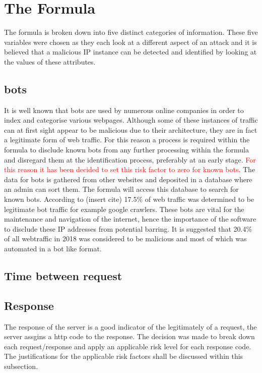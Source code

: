 \section{The Formula}

The formula is broken down into five distinct categories of information. These five variables were chosen as they each look at a different aspect of an attack and it is believed that a malicious IP instance can be detected and identified by looking at the values of these attributes. 

\subsection{bots}

It is well known that bots are used by numerous online companies in order to index and categorise various webpages. Although some of these instances of traffic can at first sight appear to be malicious due to their architecture, they are in fact a legitimate form of web traffic. For this reason a process is required within the formula to disclude known bots from any further processing within the formula and disregard them at the identification process, preferably at an early stage. \textcolor{red}{For this reason it has been decided to set this risk factor to zero for known bots}. The data for bots is gathered from other websites and deposited in a database where an admin can sort them. The formula will access this database to search for known bots. According to (insert cite) 17.5\% of web traffic was determined to be legitimate bot traffic for example google crawlers. These bots are vital for the maintenance and navigation of the internet, hence the importance of the software to disclude these IP addresses from potential barring. It is suggested that 20.4\% of all webtraffic in 2018 was considered to be malicious and most of which was automated in a bot like format.


\subsection{Time between request}

\subsection{Response}
The response of the server is a good indicator of the legitimately of a request, the server assgins a http code to the response. The decision was made to break down each request/response and apply an applicable risk level for each response code. The justifications for the applicable risk factors shall be discussed within this subsection. 

